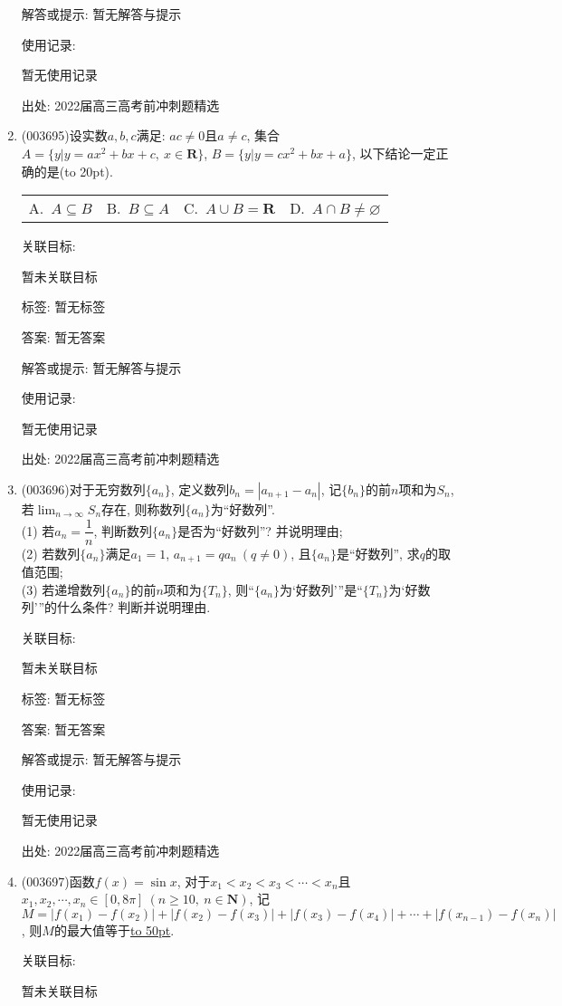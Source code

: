\documentclass[10pt,a4paper]{article}
\newcommand{\blank}[1]{\underline{\hbox to #1pt{}}}
\newcommand{\bracket}[1]{(\hbox to #1pt{})}
\newcommand{\fourch}[4]{\par\begin{tabular}{p{.23\textwidth}p{.23\textwidth}p{.23\textwidth}p{.23\textwidth}}
A.~#1 &B.~#2& C.~#3& D.~#4
\end{tabular}}
\begin{document}
\begin{enumerate}[1.]
解答或提示: 暂无解答与提示

使用记录:

暂无使用记录


出处: 2022届高三高考前冲刺题精选
\item { (003695)}设实数$a,b,c$满足: $ac\ne 0$且$a\ne c$, 集合$A=\{y|y=ax^2+bx+c, \ x\in \mathbf{R}\}$, $B=\{y|y=cx^2+bx+a\}$, 以下结论一定正确的是\bracket{20}.
\fourch{$A\subseteq B$}{$B\subseteq A$}{$A\cup B=\mathbf{R}$}{$A\cap B\ne\varnothing$}


关联目标:

暂未关联目标



标签: 暂无标签

答案: 暂无答案

解答或提示: 暂无解答与提示

使用记录:

暂无使用记录


出处: 2022届高三高考前冲刺题精选
\item { (003696)}对于无穷数列$\{a_n\}$, 定义数列$b_n=|a_{n+1}-a_n|$, 记$\{b_n\}$的前$n$项和为$S_n$, 若$\displaystyle\lim_{n\to \infty} S_n$存在, 则称数列$\{a_n\}$为``好数列''.\\
(1) 若$a_n=\dfrac{1}{n}$, 判断数列$\{a_n\}$是否为``好数列''? 并说明理由;\\
(2) 若数列$\{a_n\}$满足$a_1=1$, $a_{n+1}=qa_n \ (q\ne 0)$, 且$\{a_n\}$是``好数列'', 求$q$的取值范围;\\
(3) 若递增数列$\{a_n\}$的前$n$项和为$\{T_n\}$, 则``$\{a_n\}$为`好数列'''是``$\{T_n\}$为`好数列'''的什么条件? 判断并说明理由.


关联目标:

暂未关联目标



标签: 暂无标签

答案: 暂无答案

解答或提示: 暂无解答与提示

使用记录:

暂无使用记录


出处: 2022届高三高考前冲刺题精选
\item { (003697)}函数$f(x)=\sin x$, 对于$x_1<x_2<x_3<\cdots<x_n$且$x_1,x_2,\cdots,x_n\in [0,8\pi] \ (n\ge 10, \ n\in \mathbf{N})$, 记$M=|f(x_1)-f(x_2) |+|f(x_2)-f(x_3)|+|f(x_3)-f(x_4)|+\cdots+| f(x_{n-1})-f(x_n)|$, 则$M$的最大值等于\blank{50}.


关联目标:

暂未关联目标




\end{enumerate}
\end{document}
